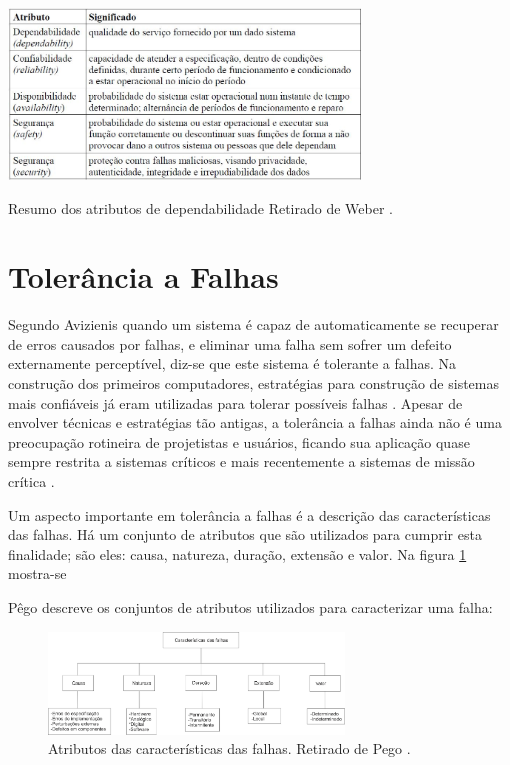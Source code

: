 \begin{table}
	\centering
	\includegraphics[width=0.7\textwidth]{figuras/tabelaDenpendabilidade.jpg}
	\caption[Resumo dos Atributos de Denpendabilidade]{Resumo dos atributos de dependabilidade Retirado de Weber \cite{Weber:2002}.}
	\label{Img:atDenp}	
\end{table}



\section{Tolerância a Falhas} \label{sec:tolerancia}

Segundo Avizienis \cite{Avizienis:1984} quando um sistema é capaz de automaticamente se recuperar de erros causados por falhas, e eliminar uma falha sem sofrer um defeito externamente perceptível, diz-se que este sistema é tolerante a falhas. Na construção dos primeiros computadores, estratégias para construção de sistemas mais confiáveis já eram utilizadas para tolerar possíveis falhas \cite{VonNewmann:1956}. Apesar de envolver técnicas e estratégias tão antigas, a tolerância a falhas ainda não é uma preocupação rotineira de projetistas e usuários, ficando sua aplicação quase sempre restrita a sistemas críticos e mais recentemente a sistemas de missão crítica \cite{Weber:2002}.

Um aspecto importante em tolerância a falhas é a descrição das características das falhas. Há um conjunto de atributos que são utilizados para cumprir esta finalidade; são eles: causa, natureza, duração, extensão e valor. Na figura \ref{Img:falhasCaracteristicas} mostra-se 

Pêgo \cite{Pego:2014} descreve os conjuntos de atributos utilizados para caracterizar uma falha:

\begin{figure}[H]
	\centering
	\includegraphics[width=0.7\textwidth]{figuras/falhasCaracteristicas.jpg}
	\caption[Características das Falhas]{Atributos das características das falhas. Retirado de Pego \cite{Pego:2014}.}
	\label{Img:falhasCaracteristicas}	
\end{figure}

